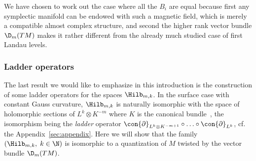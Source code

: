 \begin{rema}
\begin{enumerate}
We have chosen to work out the case where all the $B_i$ are equal because first any symplectic manifold can be endowed with such a magnetic field, which is merely a compatible almost complex structure, and second the higher rank vector bundle $\D_m (TM)$ makes it rather different from the already much studied case of first Landau levels.
\end{enumerate}

\end{rema}

\subsubsection{Ladder operators}

The last result we would like to emphasize in this introduction is the construction of some ladder operators for the spaces $\Hilb_{m,k}$. In the surface case with constant Gauss curvature, $\Hilb_{m,k}$ is naturally isomorphic with the space of holomorphic sections of $L^k \otimes K^{-m}$ where $K$ is the canonical bundle~\cite{Te06}, the isomorphism being the \emph{ladder} operator $\con{\partial}_{L^k \otimes K^{-m+1}} \circ \ldots
\circ \con{\partial}_{L^k}$, cf. the Appendix~\ref{sec:appendix}. Here we will show that the family $(\Hilb_{m,k}, \; k \in \N)$ is isomorphic to a quantization of $M$ twisted by the vector bundle $\D_m (TM) $.

